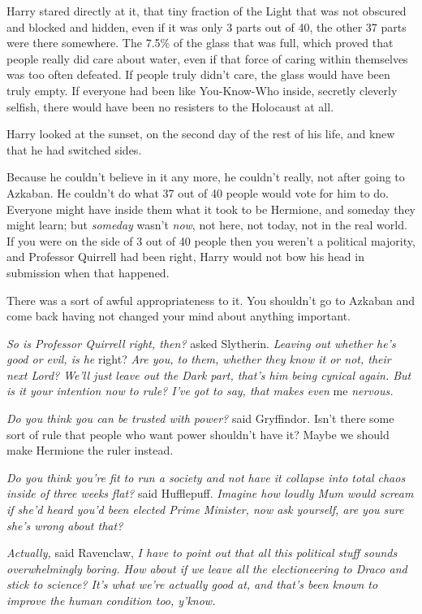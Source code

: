 Harry stared directly at it, that tiny fraction of the Light that was
not obscured and blocked and hidden, even if it was only 3 parts out of
40, the other 37 parts were there somewhere. The 7.5\% of the glass that
was full, which proved that people really did care about water, even if
that force of caring within themselves was too often defeated. If people
truly didn't care, the glass would have been truly empty. If everyone
had been like You-Know-Who inside, secretly cleverly selfish, there
would have been no resisters to the Holocaust at all.

Harry looked at the sunset, on the second day of the rest of his life,
and knew that he had switched sides.

Because he couldn't believe in it any more, he couldn't really, not
after going to Azkaban. He couldn't do what 37 out of 40 people would
vote for him to do. Everyone might have inside them what it took to be
Hermione, and someday they might learn; but \emph{someday} wasn't
\emph{now}, not here, not today, not in the real world. If you were on
the side of 3 out of 40 people then you weren't a political majority,
and Professor Quirrell had been right, Harry would not bow his head in
submission when that happened.

There was a sort of awful appropriateness to it. You shouldn't go to
Azkaban and come back having not changed your mind about anything
important.

\emph{So is Professor Quirrell right, then?} asked Slytherin.
\emph{Leaving out whether he's good or evil, is he} right? \emph{Are
you, to them, whether they know it or not, their next Lord? We'll just
leave out the Dark part, that's him being cynical again. But is it your
intention now to rule? I've got to say, that makes even} me
\emph{nervous.}

\emph{Do you think you can be trusted with power?} said Gryffindor.
Isn't there some sort of rule that people who want power shouldn't have
it? Maybe we should make Hermione the ruler instead.

\emph{Do you think you're fit to run a society and not have it collapse
into total chaos inside of three weeks flat?} said Hufflepuff.
\emph{Imagine how loudly Mum would scream if she'd heard you'd been
elected Prime Minister, now ask yourself, are you sure she's wrong about
that?}

\emph{Actually,} said Ravenclaw, \emph{I have to point out that all this
political stuff sounds overwhelmingly boring. How about if we leave all
the electioneering to Draco and stick to science? It's what we're
actually good at, and that's been known to improve the human condition
too, y'know.}

